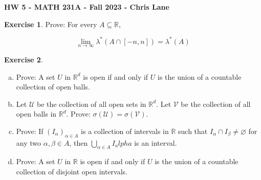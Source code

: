 \documentclass[11pt,oneside]{article}
\numberwithin{equation}{section}
\theoremstyle{definition}
\newtheorem{exercise}{Exercise}
\def\RR{\mathbb{R}}
\def\fancyU{\mathscr{U}}
\def\fancyV{\mathscr{V}}
\begin{document}
\textbf{HW 5 - MATH 231A - Fall 2023 - Chris Lane}

\begin{exercise}
  Prove: For every $A \subseteq \RR$,

  $$
  \lim \limits _{n \to \infty} \lambda ^*(A \cap [-n, n]) = \lambda^*(A)
  $$

\end{exercise}
\begin{solution}
\end{solution}

\begin{exercise}
  \begin{enumerate}[(a)]
  \item
    Prove: A set $U$ in $\RR ^ d$ is open if and only if $U$ is the union of a countable collection of open balls.
  \item
    Let $\fancyU$ be the collection of all open sets in $\RR^d$. Let $\fancyV$ be the collection of all open balls in $\RR ^d$.  Prove: $\sigma(\fancyU) = \sigma(\fancyV)$.
  \item
    Prove: If $(I_\alpha)_{\alpha \in A}$ is a collection of intervals
    in $\RR$ such that $I_\alpha \cap I_\beta \neq \varnothing$ for
    any two $\alpha, \beta \in A$, then $\bigcup \limits _ { \alpha
      \in A} I_alpha$ is an interval.
  \item
    Prove: A set $U$ in $\RR$ is open if and only if $U$ is the union
    of a countable collection of disjoint open intervals.  
    
    
  \end{enumerate}
\end{exercise}
\end{document}
